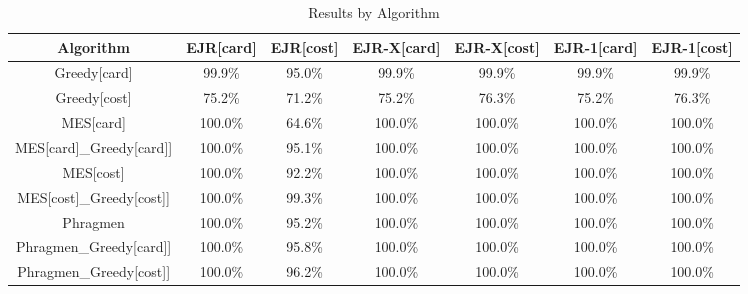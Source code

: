 

\begin{table}[h]
\centering
\begin{tabular}{ccccccc}
\toprule
Algorithm & EJR[card] & EJR[cost] & EJR-X[card] & EJR-X[cost] & EJR-1[card] & EJR-1[cost] \\
\midrule
Greedy[card] & 99.9\% & 95.0\% & 99.9\% & 99.9\% & 99.9\% & 99.9\% \\
Greedy[cost] & 75.2\% & 71.2\% & 75.2\% & 76.3\% & 75.2\% & 76.3\% \\
MES[card] & 100.0\% & 64.6\% & 100.0\% & 100.0\% & 100.0\% & 100.0\% \\
MES[card]\_Greedy[card]] & 100.0\% & 95.1\% & 100.0\% & 100.0\% & 100.0\% & 100.0\% \\
MES[cost] & 100.0\% & 92.2\% & 100.0\% & 100.0\% & 100.0\% & 100.0\% \\
MES[cost]\_Greedy[cost]] & 100.0\% & 99.3\% & 100.0\% & 100.0\% & 100.0\% & 100.0\% \\
Phragmen & 100.0\% & 95.2\% & 100.0\% & 100.0\% & 100.0\% & 100.0\% \\
Phragmen\_Greedy[card]] & 100.0\% & 95.8\% & 100.0\% & 100.0\% & 100.0\% & 100.0\% \\
Phragmen\_Greedy[cost]] & 100.0\% & 96.2\% & 100.0\% & 100.0\% & 100.0\% & 100.0\% \\
\bottomrule
\end{tabular}
\caption{Results by Algorithm}
\label{tab:print_results_by_algorithm}
\end{table}
